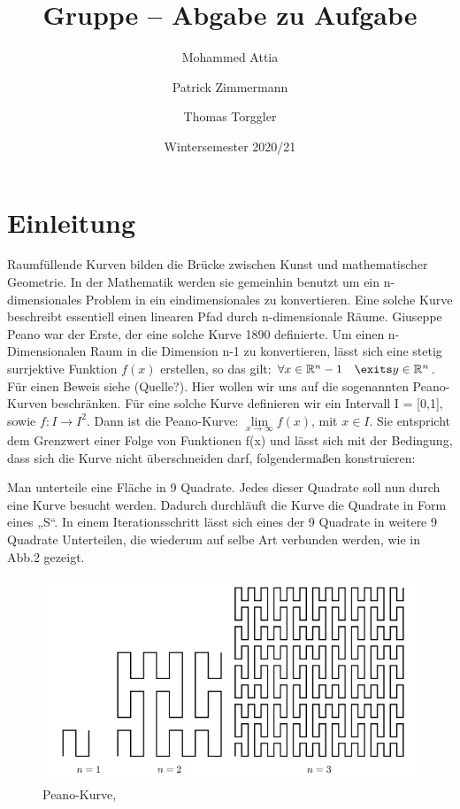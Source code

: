 \documentclass[course=asp]{aspdoc}
\author{Mohammed Attia \and Patrick Zimmermann \and Thomas Torggler}
\date{Wintersemester 2020/21} %
\title{Gruppe \theGroup{} -- Abgabe zu Aufgabe \theNumber}
\begin{document}
\maketitle

\section{Einleitung}

Raumfüllende Kurven bilden die Brücke zwischen Kunst und mathematischer Geometrie. In der Mathematik werden sie gemeinhin benutzt um ein n-dimensionales Problem in ein  eindimensionales zu konvertieren. Eine solche Kurve beschreibt essentiell einen linearen Pfad durch n-dimensionale Räume. Giuseppe Peano war der Erste, der eine solche Kurve 1890 definierte.
Um einen n-Dimensionalen Raum in die Dimension n-1 zu konvertieren, lässt sich eine stetig surrjektive Funktion $f(x)$ erstellen, so das gilt: $\forall x \in \mathbb{R}^n-1 \quad \exits y \in \mathbb{R}^n$. Für einen Beweis siehe (Quelle?). Hier wollen wir uns auf die sogenannten Peano-Kurven beschränken. Für eine solche Kurve definieren wir ein Intervall I = [0,1], sowie  $f: I \rightarrow I^2 $. Dann ist die Peano-Kurve: $\lim\limits_{x \to \infty}f(x)$, mit $x \in I$. Sie { entspricht dem Grenzwert einer Folge von Funktionen f(x) und } lässt sich mit der Bedingung, dass sich die Kurve nicht überschneiden darf, folgendermaßen konstruieren:

Man unterteile eine Fläche in 9 Quadrate. Jedes dieser Quadrate soll nun durch eine Kurve besucht werden. Dadurch durchläuft die Kurve die Quadrate in Form eines „S“.
In einem Iterationsschritt lässt sich eines der 9 Quadrate in weitere 9 Quadrate Unterteilen, die wiederum auf selbe Art verbunden werden, wie in Abb.2 gezeigt.

\begin{figure}[hb]
\centering
\includegraphics{PeanoBsp.png}
\caption{Peano-Kurve, \cite{aufgabenstellung}}\label{Abb:Peano}				%
\end{figure}
\end{document}
